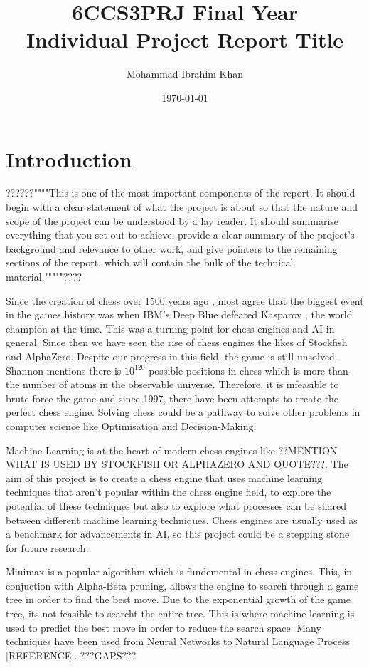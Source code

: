 \documentclass[20pt]{informatics-report}
\title{6CCS3PRJ Final Year\\\vspace{0.2cm}Individual Project Report Title}
\author{Mohammad Ibrahim Khan}
\date{\today}
\begin{document}
\createFrontMatter
\onehalfspacing
\tableofcontents
\doublespacing


\chapter{Introduction}
??????""""This is one of the most important components of the report. It should begin with a clear statement of what the project is about so that the nature and scope of the project can be understood by a lay reader. It should summarise everything that you set out to achieve, provide a clear summary of the project's background and relevance to other work, and give pointers to the remaining sections of the report, which will contain the bulk of the technical material."""""????


Since the creation of chess over 1500 years ago \cite{davidsonShortHistoryChess2012}, most agree that the biggest event in the games history was when IBM's Deep Blue defeated Kasparov \cite{hsuIBMsDeepBlue1999}, the world champion at the time. This was a turning point for chess engines and AI in general.
Since then we have seen the rise of chess engines the likes of Stockfish and AlphaZero. Despite our progress in this field, the game is still unsolved. Shannon mentions there is $10^{120}$ possible positions in chess \cite{shannonXXIIProgrammingComputer1950} which is more than the number of atoms in the observable universe. Therefore, it is infeasible to brute force the game and since 1997, there have been attempts to create the perfect chess engine. Solving chess could be a pathway to solve other problems in computer science like Optimisation
and Decision-Making. 

Machine Learning is at the heart of modern chess engines like ??MENTION WHAT IS USED BY STOCKFISH OR ALPHAZERO AND QUOTE???. The aim of this project is to create a chess engine that uses machine learning techniques that aren't popular within the chess engine field, to explore the potential of these techniques but also to explore what processes can be shared between different machine learning techniques.
Chess engines are usually used as a benchmark for advancements in AI, so this project could be a stepping stone for future research. 

Minimax is a popular algorithm which is fundemental in chess engines. This, in conjuction with Alpha-Beta pruning, allows the engine to search through a game tree in order to find the best move. Due to the exponential growth of the game tree, its not feasible to searcht the entire tree. This is where machine learning is used to predict the best move in order to reduce the search space. Many techniques have been used from Neural Networks to Natural Language Process [REFERENCE]. ???GAPS???
\end{document}
